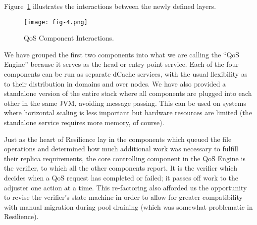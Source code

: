\documentclass{webofc}
\begin{document}
Figure~\ref{fig-4} illustrates the interactions between the newly defined layers.

\begin{figure}[h]
\centering
\texttt{[image: fig-4.png]}
\caption{QoS Component Interactions.}
\label{fig-4} 
\end{figure}

We have grouped the first two components into what we are calling the “QoS Engine” because it serves as the head or entry point service.  Each of the four components can be run as separate dCache services, with the usual flexibility as to their distribution in domains and over nodes.  We have also provided a standalone version of the entire stack where all components are plugged into each other in the same JVM, avoiding message passing.  This can be used on systems where horizontal scaling is less important but hardware resources are limited (the standalone service requires more memory, of course).

Just as the heart of Resilience lay in the components which queued the file operations and determined how much additional work was necessary to fulfill their replica requirements, the core controlling component in the QoS Engine is the verifier, to which all the other components report.   It is the verifier which decides when a QoS request has completed or failed; it passes off work to the adjuster one action at a time.  This re-factoring also afforded us the opportunity to revise the verifier’s state machine in order to allow for greater compatibility with manual migration during pool draining (which was somewhat problematic in Resilience).
\end{document}
